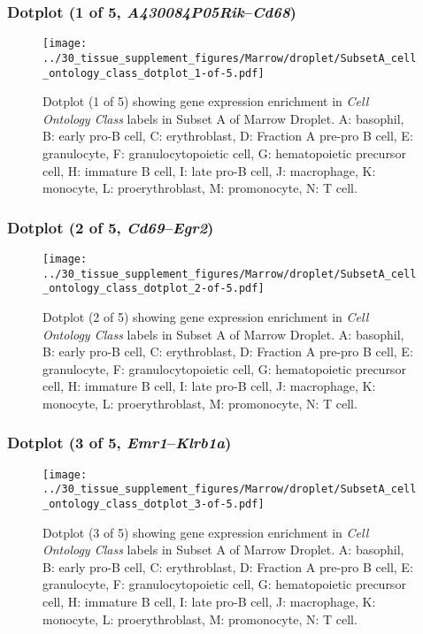 \clearpage

\subsubsection{Dotplot (1 of 5, \emph{A430084P05Rik}--\emph{Cd68})}
\begin{figure}[h]
\centering
\texttt{[image: ../30\_tissue\_supplement\_figures/Marrow/droplet/SubsetA\_cell\_ontology\_class\_dotplot\_1-of-5.pdf]}

\caption{ Dotplot (1 of 5)  showing gene expression enrichment in \emph{Cell Ontology Class} labels in Subset A of Marrow Droplet. A: basophil, B: early pro-B cell, C: erythroblast, D: Fraction A pre-pro B cell, E: granulocyte, F: granulocytopoietic cell, G: hematopoietic precursor cell, H: immature B cell, I: late pro-B cell, J: macrophage, K: monocyte, L: proerythroblast, M: promonocyte, N: T cell.}
\end{figure}


\clearpage

\subsubsection{Dotplot (2 of 5, \emph{Cd69}--\emph{Egr2})}
\begin{figure}[h]
\centering
\texttt{[image: ../30\_tissue\_supplement\_figures/Marrow/droplet/SubsetA\_cell\_ontology\_class\_dotplot\_2-of-5.pdf]}

\caption{ Dotplot (2 of 5)  showing gene expression enrichment in \emph{Cell Ontology Class} labels in Subset A of Marrow Droplet. A: basophil, B: early pro-B cell, C: erythroblast, D: Fraction A pre-pro B cell, E: granulocyte, F: granulocytopoietic cell, G: hematopoietic precursor cell, H: immature B cell, I: late pro-B cell, J: macrophage, K: monocyte, L: proerythroblast, M: promonocyte, N: T cell.}
\end{figure}


\clearpage

\subsubsection{Dotplot (3 of 5, \emph{Emr1}--\emph{Klrb1a})}
\begin{figure}[h]
\centering
\texttt{[image: ../30\_tissue\_supplement\_figures/Marrow/droplet/SubsetA\_cell\_ontology\_class\_dotplot\_3-of-5.pdf]}

\caption{ Dotplot (3 of 5)  showing gene expression enrichment in \emph{Cell Ontology Class} labels in Subset A of Marrow Droplet. A: basophil, B: early pro-B cell, C: erythroblast, D: Fraction A pre-pro B cell, E: granulocyte, F: granulocytopoietic cell, G: hematopoietic precursor cell, H: immature B cell, I: late pro-B cell, J: macrophage, K: monocyte, L: proerythroblast, M: promonocyte, N: T cell.}
\end{figure}


